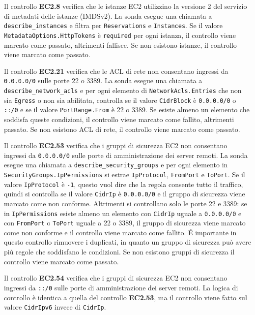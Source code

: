 Il controllo \textbf{EC2.8} verifica che le istanze EC2 utilizzino la versione 2 del servizio di metadati delle istanze (IMDSv2). La sonda esegue una chiamata a \texttt{describe\_instances} e filtra per \texttt{Reservations} e \texttt{Instances}. Se il valore \texttt{MetadataOptions.HttpTokens} è \texttt{required} per ogni istanza, il controllo viene marcato come passato, altrimenti fallisce. Se non esistono istanze, il controllo viene marcato come passato.

Il controllo \textbf{EC2.21} verifica che le ACL di rete non consentano ingressi da \texttt{0.0.0.0/0} sulle porte 22 o 3389. La sonda esegue una chiamata a \texttt{describe\_network\_acls} e per ogni elemento di \texttt{NetworkAcls.Entries} che non sia \texttt{Egress} o non sia abilitata, controlla se il valore \texttt{CidrBlock} è \texttt{0.0.0.0/0} o \texttt{::/0} e se il valore \texttt{PortRange.From} è 22 o 3389. Se esiste almeno un elemento che soddisfa queste condizioni, il controllo viene marcato come fallito, altrimenti passato. Se non esistono ACL di rete, il controllo viene marcato come passato.

Il controllo \textbf{EC2.53} verifica che i gruppi di sicurezza EC2 non consentano ingressi da \texttt{0.0.0.0/0} sulle porte di amministrazione dei server remoti. La sonda esegue una chiamata a \texttt{describe\_security\_groups} e per ogni elemento in \texttt{SecurityGroups.IpPermissions} si estrae \texttt{IpProtocol}, \texttt{FromPort} e \texttt{ToPort}. Se il valore \texttt{IpProtocol} è \texttt{-1}, questo vuol dire che la regola consente tutto il traffico, quindi si controlla se il valore \texttt{CidrIp} è \texttt{0.0.0.0/0} e il gruppo di sicurezza viene marcato come non conforme. Altrimenti si controllano solo le porte 22 e 3389: se in \texttt{IpPermissions} esiste almeno un elemento con \texttt{CidrIp} uguale a \texttt{0.0.0.0/0} e con \texttt{FromPort} o \texttt{ToPort} uguale a 22 o 3389, il gruppo di sicurezza viene marcato come non conforme e il controllo viene marcato come fallito. É importante in questo controllo rimuovere i duplicati, in quanto un gruppo di sicurezza può avere più regole che soddisfano le condizioni. Se non esistono gruppi di sicurezza il controllo viene marcato come passato.

Il controllo \textbf{EC2.54} verifica che i gruppi di sicurezza EC2 non consentano ingressi da \texttt{::/0} sulle porte di amministrazione dei server remoti. La logica di controllo è identica a quella del controllo \textbf{EC2.53}, ma il controllo viene fatto sul valore \texttt{CidrIpv6} invece di \texttt{CidrIp}. 

